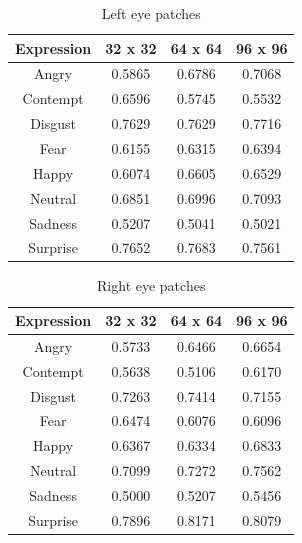 \begin{table}
\caption{Left eye patches}
\label{table:left_eye}

\begin{tabular}{| c | c | c | c |}
\hline
Expression & 32 x 32 &  64 x 64  & 96 x 96  \\

\hline
Angry & 0.5865 & 0.6786 & 0.7068 \\
Contempt & 0.6596 &	0.5745 & 0.5532 \\
Disgust	& 0.7629 &	0.7629 &	0.7716 \\
Fear &	0.6155 & 0.6315 & 0.6394 \\ 
Happy &	0.6074 & 0.6605 & 0.6529 \\ 
Neutral & 0.6851 &	0.6996 & 0.7093 \\
Sadness & 0.5207 & 0.5041 &	0.5021 \\
Surprise & 0.7652 &	0.7683 & 0.7561 \\

\hline
\end{tabular}
\end{table}

\begin{table}
\caption{Right eye patches}
\label{table:right_eye}

\begin{tabular}{| c | c | c | c |}
\hline
Expression & 32 x 32 &  64 x 64  & 96 x 96  \\

\hline
Angry    & 0.5733 & 0.6466 & 0.6654 \\
Contempt & 0.5638 & 0.5106 & 0.6170 \\ 
Disgust	 & 0.7263 & 0.7414 & 0.7155 \\
Fear	 & 0.6474 & 0.6076 & 0.6096 \\
Happy	 & 0.6367 & 0.6334 & 0.6833 \\
Neutral  & 0.7099 & 0.7272 & 0.7562 \\
Sadness  & 0.5000 & 0.5207 & 0.5456 \\
Surprise & 0.7896 & 0.8171 & 0.8079 \\

\hline
\end{tabular}
\end{table}

